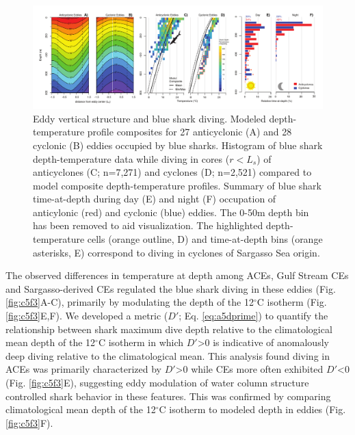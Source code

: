 \begin{figure}[htbp]
\centering
\includegraphics[width=\textwidth]{images/C5_Fig2.pdf}
\caption[Eddy vertical structure and blue shark diving]{Eddy vertical structure and blue shark diving. Modeled depth-temperature profile composites for 27 anticyclonic (A) and 28 cyclonic (B) eddies occupied by blue sharks. Histogram of blue shark depth-temperature data while diving in cores ($r < L_s$) of anticyclones (C; n=7,271) and cyclones (D; n=2,521) compared to model composite depth-temperature profiles. Summary of blue shark time-at-depth during day (E) and night (F) occupation of anticylonic (red) and cyclonic (blue) eddies. The 0-50m depth bin has been removed to aid visualization. The highlighted depth-temperature cells (orange outline, D) and time-at-depth bins (orange asterisks, E) correspond to diving in cyclones of Sargasso Sea origin.}
\label{fig:c5f2}
\end{figure}

The observed differences in temperature at depth among ACEs, Gulf Stream CEs and Sargasso-derived CEs regulated the blue shark diving in these eddies (Fig. \ref{fig:c5f3}A-C), primarily by modulating the depth of the 12$^\circ$C isotherm (Fig. \ref{fig:c5f3}E,F). We developed a metric ($D'$; Eq. \ref{eq:a5dprime}) to quantify the relationship between shark maximum dive depth relative to the climatological mean depth of the 12$^\circ$C isotherm in which $D'$>0 is indicative of anomalously deep diving relative to the climatological mean. This analysis found diving in ACEs was primarily characterized by $D'$>0 while CEs more often exhibited $D'$<0 (Fig. \ref{fig:c5f3}E), suggesting eddy modulation of water column structure controlled shark behavior in these features. This was confirmed by comparing climatological mean depth of the 12$^\circ$C isotherm to modeled \is depth in eddies (Fig. \ref{fig:c5f3}F).

